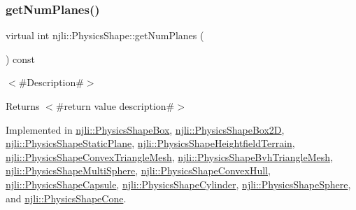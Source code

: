 \mbox{\label{classnjli_1_1_physics_shape_a11cb80220393bfce177b8bdc34f7f359}} 
\subsubsection{\texorpdfstring{get\+Num\+Planes()}{getNumPlanes()}}
{\footnotesize\ttfamily virtual int njli\+::\+Physics\+Shape\+::get\+Num\+Planes (\begin{DoxyParamCaption}{ }\end{DoxyParamCaption}) const\hspace{0.3cm}{\ttfamily [pure virtual]}}

$<$\#\+Description\#$>$

\begin{DoxyReturn}{Returns}
$<$\#return value description\#$>$ 
\end{DoxyReturn}


Implemented in \mbox{\hyperlink{classnjli_1_1_physics_shape_box_a107c31779cfb98b22c44b90d66f93db9}{njli\+::\+Physics\+Shape\+Box}}, \mbox{\hyperlink{classnjli_1_1_physics_shape_box2_d_a78cebc044d0dce9bfbf9bbad31398419}{njli\+::\+Physics\+Shape\+Box2D}}, \mbox{\hyperlink{classnjli_1_1_physics_shape_static_plane_a7602280dd520ca98ec426278cb8e3681}{njli\+::\+Physics\+Shape\+Static\+Plane}}, \mbox{\hyperlink{classnjli_1_1_physics_shape_heightfield_terrain_a46270856ceec080bb19bbab9ba0ca81e}{njli\+::\+Physics\+Shape\+Heightfield\+Terrain}}, \mbox{\hyperlink{classnjli_1_1_physics_shape_convex_triangle_mesh_a4a79b73e99c68e69332d5603f9c825f0}{njli\+::\+Physics\+Shape\+Convex\+Triangle\+Mesh}}, \mbox{\hyperlink{classnjli_1_1_physics_shape_bvh_triangle_mesh_abc8e8e1d5d04b9a5fc300841bc8fd70c}{njli\+::\+Physics\+Shape\+Bvh\+Triangle\+Mesh}}, \mbox{\hyperlink{classnjli_1_1_physics_shape_multi_sphere_ac89627a1d9681838e4539f30bd06ea82}{njli\+::\+Physics\+Shape\+Multi\+Sphere}}, \mbox{\hyperlink{classnjli_1_1_physics_shape_convex_hull_aeff289a96116eed946c2ba7c77a9a101}{njli\+::\+Physics\+Shape\+Convex\+Hull}}, \mbox{\hyperlink{classnjli_1_1_physics_shape_capsule_aa0b34e9bbff704708da44cfae05e0579}{njli\+::\+Physics\+Shape\+Capsule}}, \mbox{\hyperlink{classnjli_1_1_physics_shape_cylinder_ac0494575204d508cc5f91ebe68d3addf}{njli\+::\+Physics\+Shape\+Cylinder}}, \mbox{\hyperlink{classnjli_1_1_physics_shape_sphere_ad8e9f27811164163a87692725502de6d}{njli\+::\+Physics\+Shape\+Sphere}}, and \mbox{\hyperlink{classnjli_1_1_physics_shape_cone_abb7a45ae2636b54cd6f986c2985daf65}{njli\+::\+Physics\+Shape\+Cone}}.

